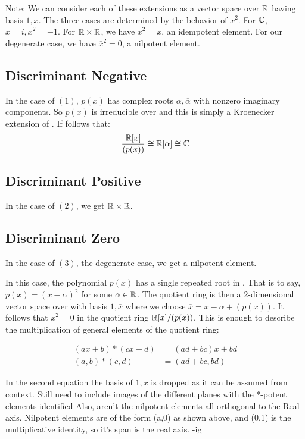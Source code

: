 \documentclass{article}
\begin{document}
Note: We can consider each of these extensions as a vector space over $\protect\mathbb{R}$ having basis $1, \overline{x}$. The three cases are determined by the behavior of $\overline{x}^2$. For $\protect\mathbb{C}$, $\overline{x} = i, \overline{x}^2 = -1 $. For $\protect\mathbb{R}\times \protect\mathbb{R}$, we have $\overline{x}^2 = \overline{x}$, an idempotent element. For our degenerate case, we have $\overline{x}^2 = 0$, a nilpotent element.

\subsection{Discriminant Negative}

In the case of $(1)$, $p(x)$ has complex roots $\alpha, \overline{\alpha}$ with nonzero imaginary components. So $p(x)$ is irreducible over \bR and this is simply a Kroenecker extension of \bR. If follows that:
\begin{align*}
    \frac{\protect\mathbb{R}[x]}{(p(x))} \cong \protect\mathbb{R}[\alpha] \cong \protect\mathbb{C} 
\end{align*}

\subsection{Discriminant Positive}

    In the case of $(2)$, we get $\protect\mathbb{R} \times \protect\mathbb{R}$. 

\subsection{Discriminant Zero}

In the case of $(3)$, the degenerate case, we get a nilpotent element. 

In this case, the polynomial $p(x)$ has a single repeated root in \bR. That is to say, $p(x) = (x-\alpha)^2$ for some $\alpha \in \protect\mathbb{R}$. The quotient ring is then a 2-dimensional vector space over \bR with basis $1, \overline{x}$ where we choose $\overline{x} = x - \alpha + (p(x))$. It follows that $\overline{x}^2 = 0$ in the quotient ring $\protect\mathbb{R}[x]/(p(x))$. This is enough to describe the multiplication of general elements of the quotient ring:

\begin{align*}
    (a\overline{x} + b) * (c\overline{x} + d) &= (ad+bc)\overline{x}+bd \\
    (a,b) * (c,d) &= (ad+bc, bd)
\end{align*}

In the second equation the basis of $1,\overline{x}$ is dropped as it can be assumed from context. {\color{blue} Still need to include images of the different planes with the *-potent elements identified Also, aren't the nilpotent elements all orthogonal to the Real axis. Nilpotent elements are of the form (a,0) as shown above, and (0,1) is the multiplicative identity, so it's span is the real axis. -ig}
\end{document}

